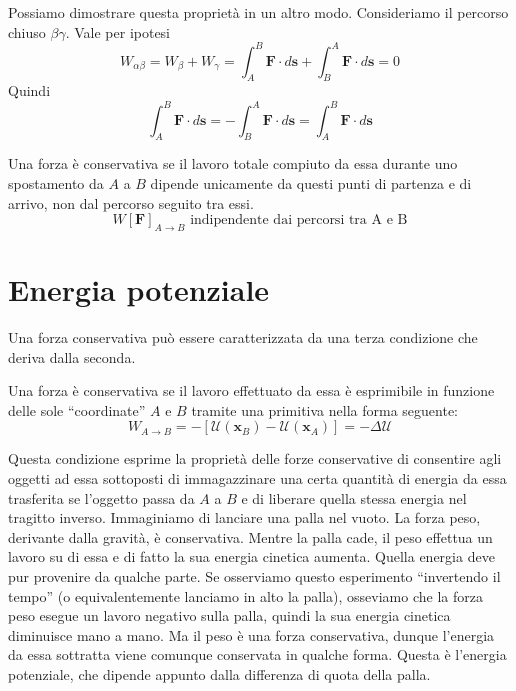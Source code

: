 Possiamo dimostrare questa proprietà in un altro modo. Consideriamo il percorso
chiuso $\beta\gamma$. Vale per ipotesi
\[ W_{\alpha\beta} = W_\beta + W_\gamma = \int_{A}^{B}\mathbf{F}\cdot d\mathbf{s} + \int_{B}^{A}\mathbf{F}\cdot d\mathbf{s} = 0 \]
Quindi 
\[ \int_{A}^{B}\mathbf{F}\cdot d\mathbf{s} = - \int_{B}^{A}\mathbf{F}\cdot d\mathbf{s} = \int_{A}^{B}\mathbf{F}\cdot d\mathbf{s} \]

\vspace{8pt}
\begin{tcolorbox}[colback = red!30, colframe = red!30!black, title = {Forza conservativa (condizione II)}]
    Una forza è conservativa se il lavoro totale compiuto da essa durante uno spostamento
    da $A$ a $B$ dipende unicamente da questi punti di partenza e di arrivo, non
    dal percorso seguito tra essi.
    \[ W[\mathbf{F}]_{A\to B} \text{ indipendente dai percorsi tra A e B} \]
\end{tcolorbox}
\vspace{5pt}

\section{Energia potenziale}
Una forza conservativa può essere caratterizzata da una terza condizione che deriva
dalla seconda.

\vspace{8pt}
\begin{tcolorbox}[colback = red!30, colframe = red!30!black, title = {Forza conservativa (condizione III)}]
    Una forza è conservativa se il lavoro effettuato da essa è esprimibile in
    funzione delle sole ``coordinate'' $A$ e $B$ tramite una primitiva nella forma
    seguente:
    \[ W_{A\to B} = -\left[\mathcal{U}(\mathbf{x}_B) - \mathcal{U}(\mathbf{x}_A)\right] = -\Delta\mathcal{U} \]
\end{tcolorbox}
\vspace{5pt}

\noindent Questa condizione esprime la proprietà delle forze conservative di
consentire agli oggetti ad essa sottoposti di immagazzinare una certa quantità
di energia da essa trasferita se l'oggetto passa da $A$ a $B$ e di liberare
quella stessa energia nel tragitto inverso. Immaginiamo di lanciare una palla
nel vuoto. La forza peso, derivante dalla gravità, è conservativa. Mentre la
palla cade, il peso effettua un lavoro su di essa e di fatto la sua energia
cinetica aumenta. Quella energia deve pur provenire da qualche parte. Se osserviamo
questo esperimento ``invertendo il tempo'' (o equivalentemente lanciamo in alto
la palla), osseviamo che la forza peso esegue un lavoro negativo sulla palla,
quindi la sua energia cinetica diminuisce mano a mano. Ma il peso è una forza
conservativa, dunque l'energia da essa sottratta viene comunque conservata
in qualche forma. Questa è l'energia potenziale, che dipende appunto dalla differenza
di quota della palla.

